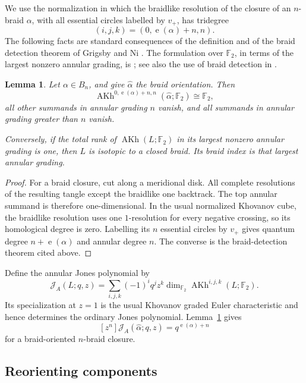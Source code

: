 \documentclass[10pt,a4paper]{amsart}
\newtheorem{lemma}[theorem]{Lemma}
\newcommand{\F}{\mathbb F_2}
\newcommand{\AKh}{\operatorname{AKh}}
\newcommand{\e}{\operatorname{e}}
\begin{document}
We use the normalization in which the braidlike resolution of the closure of an
\(n\)-braid \(\alpha\), with all essential circles labelled by \(v_+\), has tridegree
\[
  (i,j,k)=(0,\e(\alpha)+n,n).
\]
The following facts are standard consequences of the definition and of the braid
detection theorem of Grigsby and Ni \cite[Corollary~1.2]{GrigsbyNi}.  The
formulation over \(\mathbb F_2\), in terms of the largest nonzero annular grading, is
\cite[Proposition~2.2.8]{Kim}; see also the use of braid detection in
\cite[proof of Theorem~3.11]{Binns}.

\begin{lemma}\label{lem:extremal}
Let \(\alpha\in B_n\), and give \(\widehat\alpha\) the braid orientation.  Then
\[
  \AKh^{0,\e(\alpha)+n,n}(\widehat\alpha;\F)\cong\F,
\]
all other summands in annular grading \(n\) vanish, and all summands in annular
grading greater than \(n\) vanish.

Conversely, if the total rank of \(\AKh(L;\F)\) in its largest nonzero annular
grading is one, then \(L\) is isotopic to a closed braid.  Its braid index is that
largest annular grading.
\end{lemma}

\begin{proof}
For a braid closure, cut along a meridional disk.  All complete resolutions of the
resulting tangle except the braidlike one backtrack.  The top annular summand is
therefore one-dimensional.  In the usual normalized Khovanov cube, the braidlike
resolution uses one \(1\)-resolution for every negative crossing, so its homological
degree is zero.  Labelling its \(n\) essential circles by \(v_+\) gives quantum degree
\(n+\e(\alpha)\) and annular degree \(n\).  The converse is the braid-detection
theorem cited above.
\end{proof}

Define the annular Jones polynomial by
\[
  \mathcal J_A(L;q,z)
  =\sum_{i,j,k}(-1)^i q^jz^k
       \dim_{\F}\AKh^{i,j,k}(L;\F).
\]
Its specialization at \(z=1\) is the usual Khovanov graded Euler characteristic and
hence determines the ordinary Jones polynomial.  Lemma~\ref{lem:extremal} gives
\begin{equation}\label{eq:top-annular-term}
  [z^n]\mathcal J_A(\widehat\alpha;q,z)=q^{\e(\alpha)+n}
\end{equation}
for a braid-oriented \(n\)-braid closure.

\subsection{Reorienting components}
\end{document}

